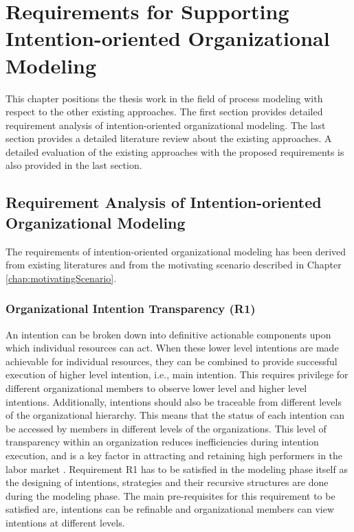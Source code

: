\chapter{Requirements for Supporting Intention-oriented Organizational Modeling}
\label{chap:analysis}
This chapter positions the thesis work in the field of process modeling with respect to the other existing approaches. The first section provides detailed requirement analysis of intention-oriented organizational modeling. The last section provides a detailed literature review about the existing approaches. A detailed evaluation of the existing approaches with the proposed requirements is also provided in the last section.

\section{Requirement Analysis of Intention-oriented Organizational Modeling}
\label{sec:requirementssupoorting}
The requirements of intention-oriented organizational modeling has been derived from existing literatures \cite{McManus2007, Mandic2010,Bleistein2006, Lacom, Brambilla2012} and from the motivating scenario described in Chapter \ref{chap:motivatingScenario}. 

\subsection{Organizational Intention Transparency (R1)}
An intention can be broken down into definitive actionable components upon which individual resources can act. When these lower level intentions are made achievable for individual resources, they can be combined to provide successful execution of higher level intention, i.e., main intention. This requires privilege for different organizational members to observe lower level and higher level intentions. Additionally, intentions should also be traceable from different levels of the organizational hierarchy. This means that the status of each intention can be accessed by members in different levels of the organizations. This level of transparency within an organization reduces inefficiencies during intention execution, and is a key factor in attracting and retaining high performers in the labor market \cite{McManus2007}. Requirement R1 has to be satisfied in the modeling phase itself as the designing of intentions, strategies and their recursive structures are done during the modeling phase. The main pre-requisites for this requirement to be satisfied are, intentions can be refinable and organizational members can view intentions at different levels. 

